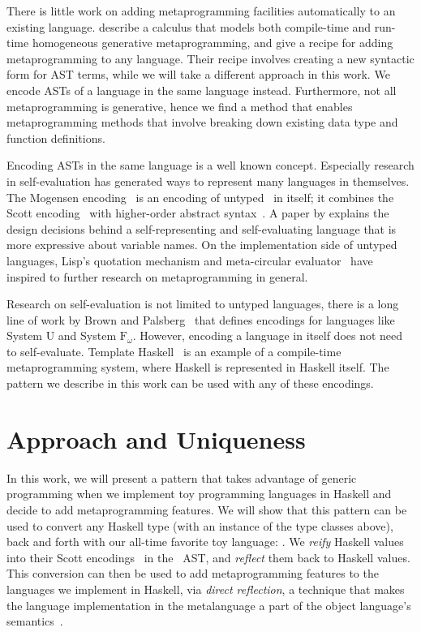 \documentclass[format=acmsmall, review=false, screen=true]{acmart}
\begin{document}
There is little work on adding metaprogramming facilities automatically to an existing language.
\citet{hgmp} describe a calculus that models both compile-time and run-time homogeneous generative metaprogramming, and give a recipe for adding metaprogramming to any language.
Their recipe involves creating a new syntactic form for AST terms, while we
will take a different approach in this work.
We encode ASTs of a language in the same language instead.
Furthermore, not all metaprogramming is generative, hence we find a method that enables metaprogramming methods that involve breaking down existing data type and function definitions.

Encoding ASTs in the same language is a well known concept.
Especially research in self-evaluation has generated ways to represent many
languages in themselves.  The Mogensen encoding~\cite{mogensen} is an encoding
of untyped \lc\ in itself; it combines the Scott encoding~\cite{scott} with
higher-order abstract syntax~\cite{hoas}.
A paper by \citet{stump2009directly} explains the design decisions behind a
self-representing and self-evaluating language that is more expressive about
variable names.  On the implementation side of untyped languages, Lisp's
quotation mechanism and meta-circular evaluator~\cite{mccarthy1965lisp}
have inspired to further research on metaprogramming in general.

Research on self-evaluation is not limited to untyped languages, there is a
long line of work by Brown and
Palsberg~\cite{brownU,brownBreaking,brownIntensional} that defines encodings
for languages like System U and System $\text{F}_\omega$.
However, encoding a language in itself does not need to self-evaluate.
Template Haskell~\cite{sheard2002template} is an example of a compile-time
metaprogramming system, where Haskell is represented in Haskell itself.
The pattern we describe in this work can be used with any of these encodings.


\section{Approach and Uniqueness}

In this work, we will present a pattern that takes advantage of generic programming
when we implement toy programming languages in Haskell and decide to add
metaprogramming features. We will show that this pattern
can be used to convert any Haskell type (with an instance of the type classes
above), back and forth with our all-time favorite toy language: \lc.
We \mbox{\emph{reify}} Haskell values into their Scott encodings~\cite{scott}
in the \lc\ AST, and \mbox{\emph{reflect}} them back to Haskell values.
This conversion can then be used to add metaprogramming features to the languages we implement in Haskell, via
  \emph{direct reflection}, a technique that makes the language implementation
  in the metalanguage a part of the object language's semantics~\cite{barzilayphd}.
\end{document}
